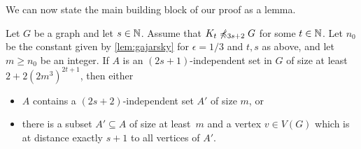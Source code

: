 



We can now state the main building block of our proof as a lemma. 

\begin{lemma}\label{lem:apex}
Let $G$ be a graph and let $s\in \mathbb{N}$. 
Assume that $K_t\not\preccurlyeq_{3s+2} G$ for some $t\in \mathbb{N}$. 
Let $n_0$ be the constant given by \cref{lem:gajarsky} for $\epsilon=1/3$ and $t,s$ as above, 
and let $m\geq n_0$ be an integer. 
If $A$ is an $(2s+1)$-independent set in $G$ of size at least $2+2(2m^3)^{2t+1}$,
then either 
\begin{itemize}
\item $A$ contains a $(2s+2)$-independent set $A'$ of size $m$, or
\item there is a subset $A'\subseteq A$ of size at least~$m$ and
a vertex $v\in V(G)$ which is at distance exactly $s+1$ to all vertices of $A'$. 
\end{itemize}
\end{lemma}




     

